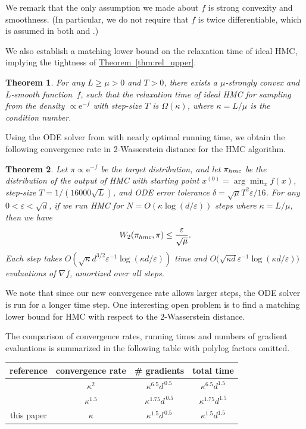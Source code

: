 \documentclass[11pt]{article}
\numberwithin{equation}{section}
\newtheorem{theorem}{Theorem}[section]
\theoremstyle{definition}
\theoremstyle{plain}
\newcommand{\eee}{\mathrm e}
\newcommand{\expref}[2]{\hyperref[#2]{#1~\ref{#2}}}
\newcommand{\grad}{\nabla}
\newcommand{\eps}{\varepsilon}
\begin{document}
We remark that the only assumption we made about $f$ is strong convexity and
%
smoothness. (In particular,  %
we do not require that $f$ is twice differentiable, which is assumed in both \cite{LSV18} and \cite{MS17}.)   %

We also establish a matching lower bound on the relaxation time of ideal HMC, implying the tightness of \expref{Theorem}{thm:rel_upper}. 
\begin{theorem}\label{thm:rel_lower}
	For any $L \ge \mu > 0$ and $T>0$, there exists a $\mu$-strongly convex and $L$-smooth function~$f$, such that the relaxation time of ideal HMC for sampling from the density $\propto \eee^{-f}$ with step-size $T$ is $\Omega(\kappa)$, where $\kappa = L/\mu$ is the condition number. 
\end{theorem}

Using the ODE solver from \cite{LSV18} with nearly optimal running time, we obtain the following convergence rate in 2-Wasserstein distance for the HMC algorithm. 
%
\begin{theorem}
	\label{thm:mixing}
	Let $\pi \propto \eee^{-f}$ be the target distribution, and let $\pi_{\textsc{hmc}}$ be the distribution of the output of HMC with starting point $x^{(0)} = \arg\min_x f(x)$, step-size $T = 1/(16000\sqrt{L})$, and 
	ODE error tolerance $\delta = \sqrt{\mu}T^2 \eps/16$.
	For any $0<\eps<\sqrt{d}$, if we run HMC for $N = O\left( \kappa \log(d/\eps) \right)$ steps where $\kappa = L/\mu$, then we have 
	\begin{equation}
	W_2(\pi_{\textsc{hmc}},\pi) \le \frac{\eps}{\sqrt{\mu}}.
	\end{equation}
	Each step takes $O\left( \sqrt{\kappa}d^{3/2}\eps^{-1} \log(\kappa d/\eps) \right)$ time and $O\big( \sqrt{\kappa d}\eps^{-1} \log(\kappa d/\eps) \big)$ evaluations of $\grad f$, amortized over all steps.
\end{theorem}
We note that since our new convergence rate allows larger steps, the ODE solver is run for a longer time step. 
One interesting open problem is to find a matching lower bound for HMC with respect to the 2-Wasserstein distance. 

The comparison of convergence rates, running times and numbers of gradient evaluations is summarized in the following table with polylog factors omitted. 

\begin{center}
{\renewcommand{\arraystretch}{1.3}%
	\begin{tabular}{c|c|c|c}
	\hline
	reference & convergence rate & \# gradients & total time\\
	\hline
\cite{MS17} & $\kappa^2$ & $\kappa^{6.5} d^{\,0.5}$  & $\kappa^{6.5} d^{1.5}$ \\
\cite{LSV18} & $\kappa^{1.5}$ & $\kappa^{1.75} d^{\,0.5}$ &  $\kappa^{1.75} d^{1.5}$ \\
this paper & $\kappa$ & $\kappa^{1.5} d^{\,0.5}$ & $\kappa^{1.5} d^{1.5}$\\
\hline
\end{tabular}
	}
\end{center}
\end{document}
